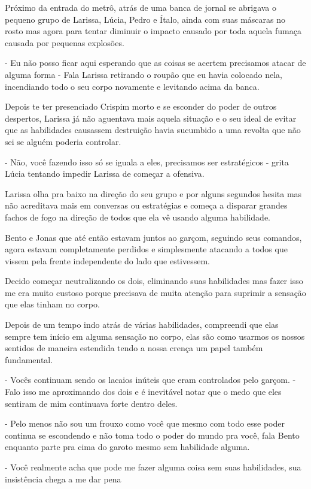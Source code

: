 Próximo da entrada do metrô, atrás de uma banca de jornal se abrigava o pequeno grupo de Larissa, Lúcia, Pedro e Ítalo, ainda com suas máscaras no rosto mas agora para tentar diminuir o impacto causado por toda aquela fumaça causada por pequenas explosões.

- Eu não posso ficar aqui esperando que as coisas se acertem precisamos atacar de alguma forma - Fala Larissa retirando o roupão que eu havia colocado nela, incendiando todo o seu corpo novamente e levitando acima da banca.

Depois te ter presenciado Crispim morto e se esconder do poder de outros despertos, Larissa já não aguentava mais aquela situação e o seu ideal de evitar que as habilidades causassem destruição havia sucumbido a uma revolta que não sei se alguém poderia controlar.

- Não, você fazendo isso só se iguala a eles, precisamos ser estratégicos - grita Lúcia tentando impedir Larissa de começar a ofensiva.

Larissa olha pra baixo na direção do seu grupo e por alguns segundos hesita mas não acreditava mais em conversas ou estratégias e começa a disparar grandes fachos de fogo na direção de todos que ela vê usando alguma habilidade.

Bento e Jonas que até então estavam juntos ao garçom, seguindo seus comandos, agora estavam completamente perdidos e simplesmente atacando a todos que vissem pela frente independente do lado que estivessem.

 Decido começar neutralizando os dois, eliminando suas habilidades mas fazer isso me era muito custoso porque precisava de muita atenção para suprimir a sensação que elas tinham no corpo.

Depois de um tempo indo atrás de várias habilidades, compreendi que elas sempre tem início em alguma sensação no corpo, elas são como usarmos os nossos sentidos de maneira estendida tendo a nossa crença um papel também fundamental.

- Vocês continuam sendo os lacaios inúteis que eram controlados pelo garçom. - Falo isso me aproximando dos dois e é inevitável notar que o medo que eles sentiram de mim continuava forte dentro deles.

- Pelo menos não sou um frouxo como você que mesmo com todo esse poder continua se escondendo e não toma todo o poder do mundo pra você, fala Bento enquanto parte pra cima do garoto mesmo sem habilidade alguma.

- Você realmente acha que pode me fazer alguma coisa sem suas habilidades, sua insistência chega a me dar pena

